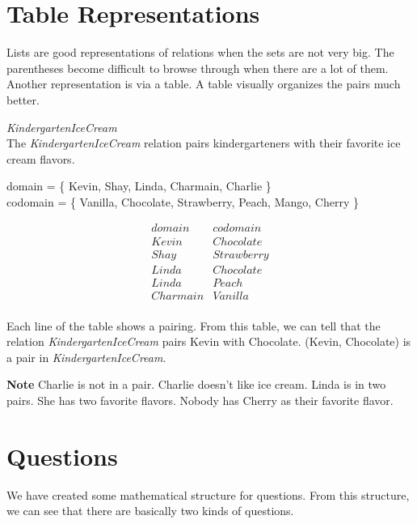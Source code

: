 \documentclass{ximera}
\begin{document}
\section{Table Representations}



Lists are good representations of relations when the sets are not very big. The parentheses become difficult to browse through when there are a lot of them. Another representation is via a table. A table visually organizes the pairs much better.

\begin{example} \textit{KindergartenIceCream} \\
The \textit{KindergartenIceCream} relation pairs kindergarteners with their favorite ice cream flavors.

domain = \{ Kevin, Shay, Linda, Charmain, Charlie \}  \\
codomain = \{ Vanilla, Chocolate, Strawberry, Peach, Mango, Cherry \} 

\[
\begin{array}{l|l}
    domain      & codomain      \\ \hline
    Kevin   &  Chocolate \\
    Shay   & Strawberry \\
    Linda  &  Chocolate \\
    Linda  &  Peach \\
    Charmain &  Vanilla \\ 
\end{array}
\]


Each line of the table shows a pairing. From this table, we can tell that the relation \textit{KindergartenIceCream} pairs Kevin with Chocolate.  (Kevin, Chocolate) is a pair in \textit{KindergartenIceCream}.

\textbf{Note} Charlie is not in a pair.  Charlie doesn't like ice cream. Linda is in two pairs.  She has two favorite flavors.  Nobody has Cherry as their favorite flavor.

\end{example} 





\section{Questions}


We have created some mathematical structure for questions. From this structure, we can see that there are basically two kinds of questions.
\end{document}
